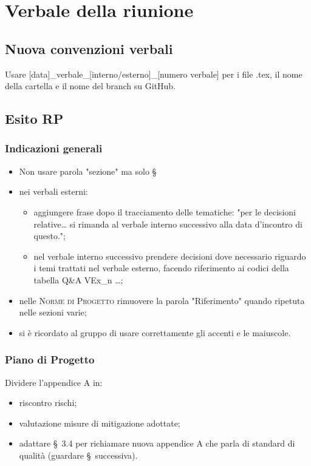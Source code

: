 \section{Verbale della riunione}

\subsection{Nuova convenzioni verbali}
Usare [data]\_verbale\_[interno/esterno]\_[numero verbale] per i file .tex, il nome della cartella e il nome del branch su GitHub.

\subsection{Esito RP}

\subsubsection{Indicazioni generali}
\begin{itemize}
	\item Non usare parola "sezione" ma solo \S\;
	\item nei verbali esterni:
	\begin{itemize}
		\item aggiungere frase dopo il tracciamento delle tematiche: "per le decisioni relative… si rimanda al verbale interno successivo alla data d'incontro di questo.";
		\item nel verbale interno successivo prendere decisioni dove necessario riguardo i temi trattati nel verbale esterno, facendo riferimento ai codici della tabella Q\&A VEx\_n …;
	\end{itemize}
	\item nelle \textsc{Norme di Progetto} rimuovere la parola "Riferimento" quando ripetuta nelle sezioni varie;
	\item si è ricordato al gruppo di usare correttamente gli accenti e le maiuscole.
\end{itemize}

\subsubsection{Piano di Progetto}
Dividere l'appendice A in:
\begin{itemize}
	\item riscontro rischi;
	\item valutazione misure di mitigazione adottate;
	\item adattare \S\ 3.4 per richiamare nuova appendice A che parla di standard di qualità (guardare \S\ successiva).
\end{itemize}

